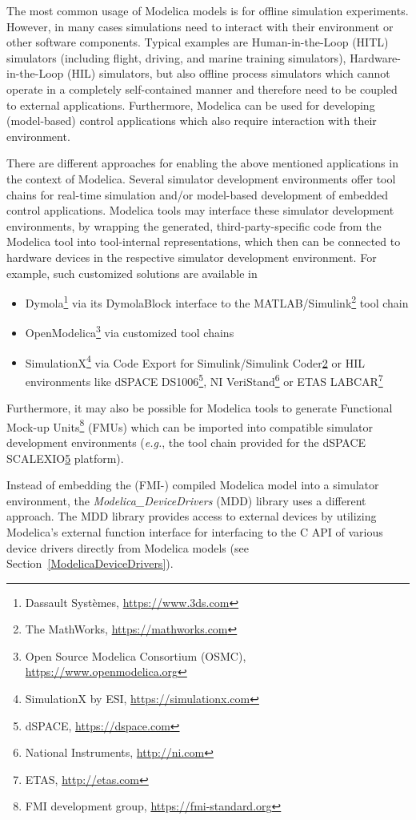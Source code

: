 \documentclass{resources/modelica}
\begin{document}
The most common usage of Modelica models is for offline simulation experiments.
However, in many cases simulations need to interact with their environment or
other software components.
Typical examples are Human-in-the-Loop (HITL) simulators (including flight,
driving, and marine training simulators), Hardware-in-the-Loop (HIL) simulators,
but also offline process simulators which cannot operate in a completely
self-contained manner and therefore need to be coupled to external applications.
Furthermore, Modelica can be used for developing (model-based) control
applications which also require interaction with their environment.

There are different approaches for enabling the above mentioned applications in
the context of Modelica. Several simulator development environments offer tool chains for
real-time simulation and/or model-based development of embedded control
applications. Modelica tools may interface these simulator development environments, by wrapping the generated, third-party-specific code
from the Modelica tool into tool-internal representations, which then can be connected to hardware devices in the respective simulator development environment. For example, such customized solutions are available in
\begin{itemize}
 \item Dymola\footnote{Dassault Systèmes, \url{https://www.3ds.com}} via its DymolaBlock interface to the MATLAB/Simulink\footnote{\label{tmw}The MathWorks, \url{https://mathworks.com}} tool chain
 \item OpenModelica\footnote{Open Source Modelica Consortium (OSMC), \url{https://www.openmodelica.org}} via customized tool chains \citep{Worschech2012}
 \item SimulationX\footnote{SimulationX by ESI, \url{https://simulationx.com}} via Code Export for Simulink/Simulink Coder\cref{tmw} or HIL environments like dSPACE DS1006\footnote{\label{dspace}dSPACE, \url{https://dspace.com}}, NI VeriStand\footnote{National Instruments, \url{http://ni.com}} or ETAS LAB\-CAR\footnote{ETAS, \url{http://etas.com}} \citep{Blochwitz2009}
\end{itemize}
Furthermore, it may also be possible for Modelica tools to generate Functional
Mock-up Units\footnote{FMI development group,
\url{https://fmi-standard.org}} (FMUs) which can be imported into compatible simulator
development environments (\textit{e.g.}, the tool chain provided for the dSPACE SCALEXIO\cref{dspace} platform).

Instead of embedding the (FMI-) compiled Modelica model into a simulator
environment, the \emph{Modelica\_DeviceDrivers} (MDD) library uses a different approach.
The MDD library provides access to external devices by utilizing Modelica's external
function interface for interfacing to the C API of various device drivers directly from Modelica
models (see Section~\ref{ModelicaDeviceDrivers}).
\end{document}
